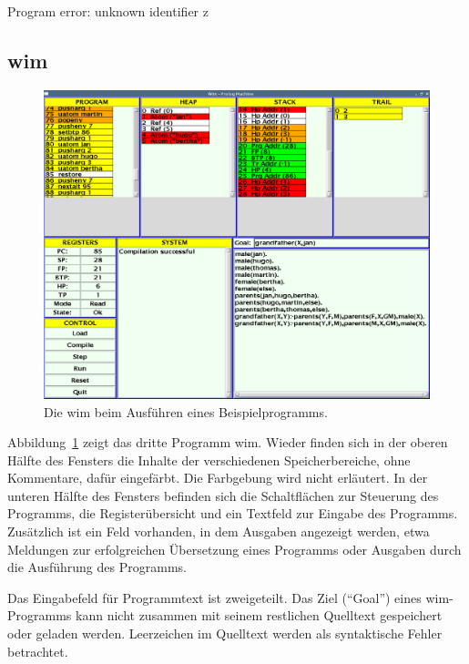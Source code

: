 \documentclass[german, a4paper, parskip, bibliography=totoc]{scrartcl}
\begin{document}
\begin{addmargin}[2em]{2em}
    \ttfamily Program error: unknown identifier z
\end{addmargin}


\subsection{wim}
\begin{figure}[htb]
    \centering
    \includegraphics[width=\textwidth]{screenshot_old_wim.png}
    \caption{Die wim beim Ausführen eines Beispielprogramms.}
    \label{img_gofer_wim}
\end{figure}

Abbildung~\ref{img_gofer_wim} zeigt das dritte Programm wim. Wieder finden sich
in der oberen Hälfte des Fensters die Inhalte der verschiedenen
Speicherbereiche, ohne Kommentare, dafür eingefärbt. Die Farbgebung wird nicht
erläutert. In der unteren Hälfte des Fensters befinden sich die
Schaltflächen zur Steuerung des Programms, die Registerübersicht und ein
Textfeld zur Eingabe des Programms. Zusätzlich ist ein Feld vorhanden, in dem
Ausgaben angezeigt werden, etwa Meldungen zur erfolgreichen Übersetzung eines
Programms oder Ausgaben durch die Ausführung des Programms.

Das Eingabefeld für Programmtext ist zweigeteilt. Das Ziel (\enquote{Goal})
eines wim-Programms kann nicht zusammen mit seinem restlichen Quelltext
gespeichert oder geladen werden. Leerzeichen im Quelltext werden als
syntaktische Fehler betrachtet.
\end{document}
